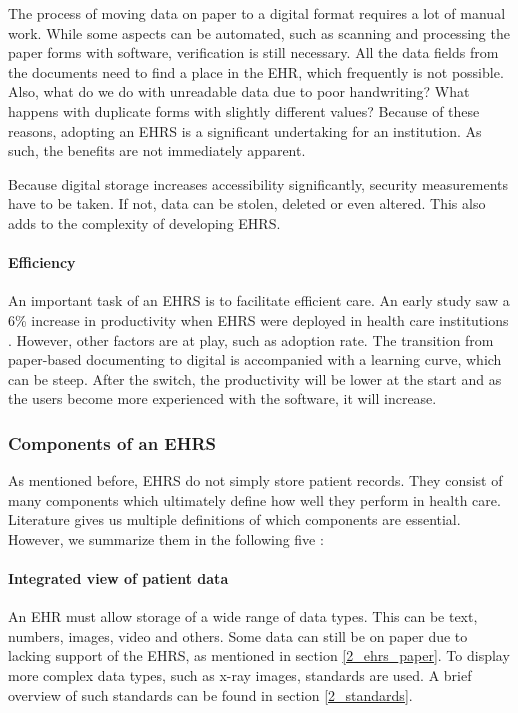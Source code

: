         The process of moving data on paper to a digital format requires a lot of manual work. While some aspects can be automated, such as scanning and processing the paper forms with software, verification is still necessary. All the data fields from the documents need to find a place in the EHR, which frequently is not possible. Also, what do we do with unreadable data due to poor handwriting? What happens with duplicate forms with slightly different values? Because of these reasons, adopting an EHRS is a significant undertaking for an institution. As such, the benefits are not immediately apparent.

        Because digital storage increases accessibility significantly, security measurements have to be taken. If not, data can be stolen, deleted or even altered. This also adds to the complexity of developing EHRS.

        \paragraph{Efficiency} An important task of an EHRS is to facilitate efficient care. An early study saw a 6\% increase in productivity when EHRS were deployed in health care institutions \cite{ehrs_efficiency}. However, other factors are at play, such as adoption rate. The transition from paper-based documenting to digital is accompanied with a learning curve, which can be steep. After the switch, the productivity will be lower at the start and as the users become more experienced with the software, it will increase.

        \subsubsection{Components of an EHRS}

        As mentioned before, EHRS do not simply store patient records. They consist of many components which ultimately define how well they perform in health care. Literature gives us multiple definitions of which components are essential. However, we summarize them in the following five \cite{biomedical_informatics}:

        \paragraph{Integrated view of patient data} An EHR must allow storage of a wide range of data types. This can be text, numbers, images, video and others. Some data can still be on paper due to lacking support of the EHRS, as mentioned in section \ref{2_ehrs_paper}. To display more complex data types, such as x-ray images, standards are used. A brief overview of such standards can be found in section \ref{2_standards}.

